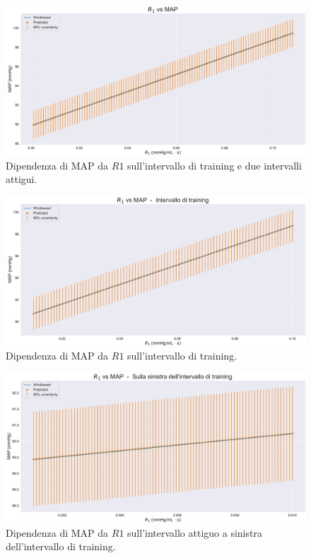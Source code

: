 \begin{figure}[!htb]
    \centering
    \includegraphics[width=1\textwidth]{images/Training (risultati)/MAP/MAP - R1 - full.pdf}
    \caption{Dipendenza di MAP da $R1$ sull'intervallo di training e due intervalli attigui.}
    \label{MAP - R1 - full}
\end{figure}

\vspace{1cm}

\begin{figure}[!htb]
    \centering
    \includegraphics[width=1\textwidth]{images/Training (risultati)/MAP/MAP - R1 - training.pdf}
    \caption{Dipendenza di MAP da $R1$ sull'intervallo di training.}
    \label{MAP - R1 - training}
\end{figure}

\begin{figure}
    \centering
    \includegraphics[width=1\textwidth]{images/Training (risultati)/MAP/MAP - R1 - sx.pdf}
    \caption{Dipendenza di MAP da $R1$ sull'intervallo attiguo a sinistra dell'intervallo di training.}
    \label{MAP - R1 - sx}
\end{figure}


